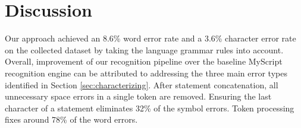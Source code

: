 \documentclass{vgtc}                          %
\begin{document}




\section{Discussion}




Our approach achieved an 8.6\% word error rate and a 3.6\% character error rate on the collected dataset by taking the language grammar rules into account. Overall, improvement of our recognition pipeline over the baseline MyScript recognition engine can be attributed to addressing the three main error types identified in Section \ref{sec:characterizing}.  After statement concatenation, all unnecessary space errors in a single token are removed. Ensuring the last character of a statement eliminates 32\% of the symbol errors. Token processing fixes around 78\% of the word errors. 
\end{document}
